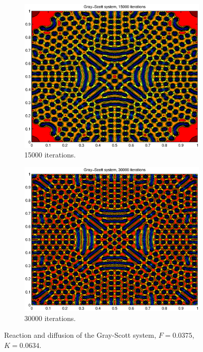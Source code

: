 \documentclass[a4paper,11pt]{article}
\begin{document}
\begin{figure}
    \hfill
    \begin{subfigure}[b]{0.48\textwidth}
        \centering
        \includegraphics[width=\textwidth]{it_15000}
        \caption{15000 iterations.}
        \label{fig:it_15000}
    \end{subfigure}
    \hfill
    \begin{subfigure}[b]{0.48\textwidth}
        \centering
        \includegraphics[width=\textwidth]{it_30000}
        \caption{30000 iterations.}
        \label{fig:it_30000}
    \end{subfigure}
    \caption{Reaction and diffusion of the Gray-Scott system, $F=0.0375$, $K=0.0634$.}
    \label{fig:gray-scott-time}
\end{figure}
\end{document}
